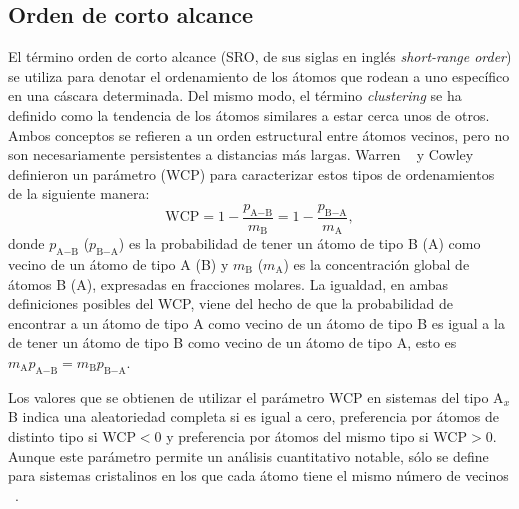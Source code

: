 \subsection{Orden de corto alcance}

El término orden de corto alcance (SRO, de sus siglas en inglés 
\textit{short-range order}) se utiliza para denotar el ordenamiento de los átomos
que rodean a uno específico en una cáscara determinada. Del mismo modo, el término 
\textit{clustering} se ha definido como la tendencia de los átomos similares a 
estar cerca unos de otros. Ambos conceptos se refieren a un orden estructural 
entre átomos vecinos, pero no son necesariamente persistentes a distancias más 
largas. Warren ~\cite{warren69} y Cowley ~\cite{cowley1950} definieron un 
parámetro (WCP) para caracterizar estos tipos de ordenamientos de la siguiente 
manera:
\begin{equation}
    \text{WCP} = 1 - \frac{p_{\text{A}-\text{B}}}{m_\text{B}} = 1 - \frac{p_{\text{B}-\text{A}}}{m_\text{A}},
\end{equation}
donde $p_{\text{A}-\text{B}}$ ($p_{\text{B}-\text{A}}$) es la probabilidad de tener un átomo de tipo B (A) como
vecino de un átomo de tipo A (B) y $m_\text{B}$ ($m_\text{A}$) es la concentración global de átomos
B (A), expresadas en fracciones molares. La igualdad, en ambas definiciones 
posibles del WCP, viene del hecho de que la probabilidad de encontrar a un átomo 
de tipo A como vecino de un átomo de tipo B es igual a la de tener un átomo de 
tipo B como vecino de un átomo de tipo A, esto es $m_\text{A} p_{\text{A}-\text{B}} = m_\text{B} p_{\text{B}-\text{A}}$.

Los valores que se obtienen de utilizar el parámetro WCP en sistemas del tipo
A$_x$B indica una aleatoriedad completa si es igual a cero, preferencia por 
átomos de distinto tipo si WCP$ < 0$ y preferencia por átomos del mismo tipo si 
WCP$ > 0$. Aunque este parámetro permite un análisis cuantitativo notable, sólo
se define para sistemas cristalinos en los que cada átomo tiene el mismo número
de vecinos ~\cite{warren69}.

